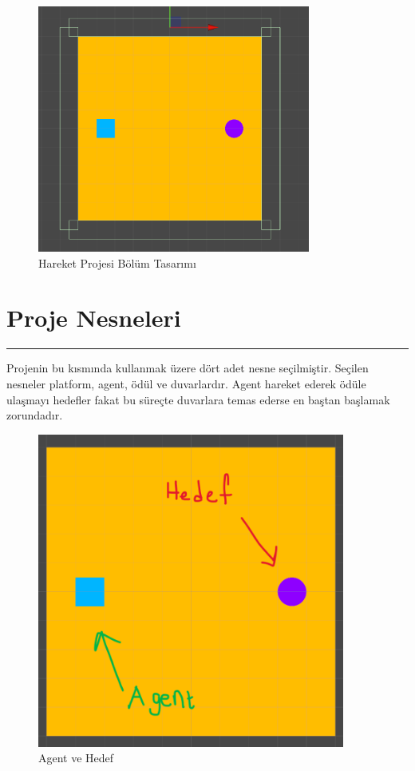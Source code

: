 \documentclass{article}
\begin{document}
\begin{figure}[h]
    \begin{center}
        \includegraphics[width=0.8\textwidth]{duvar.png}
    \end{center}
      \caption{Hareket Projesi Bölüm Tasarımı}
\end{figure}

\newpage

\section{Proje Nesneleri}
\rule{\textwidth}{0.5pt}
Projenin bu kısmında kullanmak üzere dört adet nesne seçilmiştir. Seçilen nesneler platform, agent, ödül ve duvarlardır. Agent hareket ederek ödüle ulaşmayı hedefler fakat bu süreçte duvarlara temas ederse en baştan başlamak zorundadır.\\[5pt]

\begin{figure}[h]
    \begin{center}
        \includegraphics[width=0.9\textwidth]{agent_hedef.png}
    \end{center}
      \caption{Agent ve Hedef}
\end{figure}
\end{document}
